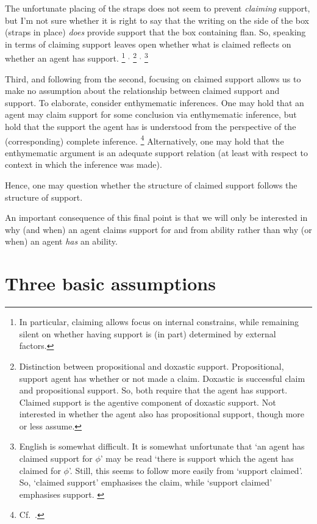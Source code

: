 \begin{note}
  The unfortunate placing of the straps does not seem to prevent \emph{claiming} support, but I'm not sure whether it is right to say that the writing on the side of the box (straps in place) \emph{does} provide support that the box containing flan.
  So, speaking in terms of claiming support leaves open whether what is claimed reflects on whether an agent has support.\nolinebreak
  \footnote{
    In particular, claiming allows focus on internal constrains, while remaining silent on whether having support is (in part) determined by external factors.
  }
  \(^{,}\)\nolinebreak
  \footnote{
    Distinction between propositional and doxastic support.
    Propositional, support agent has whether or not made a claim.
    Doxastic is successful claim and propositional support.
    So, both require that the agent has support.
    Claimed support is the agentive component of doxastic support.
    Not interested in whether the agent also has propositional support, though more or less assume.
  }
  \(^{,}\)\nolinebreak
  \footnote{
    {
      \color{red}
      English is somewhat difficult.
      It is somewhat unfortunate that `an agent has claimed support for \(\phi\)' may be read `there is support which the agent has claimed for \(\phi\)'.
      Still, this seems to follow more easily from `support claimed'.
      So, `claimed support' emphasises the claim, while `support claimed' emphasises support.
    }
  }

  Third, and following from the second, focusing on claimed support allows us to make no assumption about the relationship between claimed support and support.
  To elaborate, consider enthymematic inferences.
  One may hold that an agent may claim support for some conclusion via enthymematic inference, but hold that the support the agent has is understood from the perspective of the (corresponding) complete inference.\nolinebreak
  \footnote{
    Cf.\ \textcite{Moretti:2019wx}.
  }
  Alternatively, one may hold that the enthymematic argument is an adequate support relation (at least with respect to context in which the inference was made).

  Hence, one may question whether the structure of claimed support follows the structure of support.

  An important consequence of this final point is that we will only be interested in why (and when) an agent claims support for and from ability rather than why (or when) an agent \emph{has} an ability.
\end{note}

\section{Three basic assumptions}
\label{sec:three-basic-assumpt}


